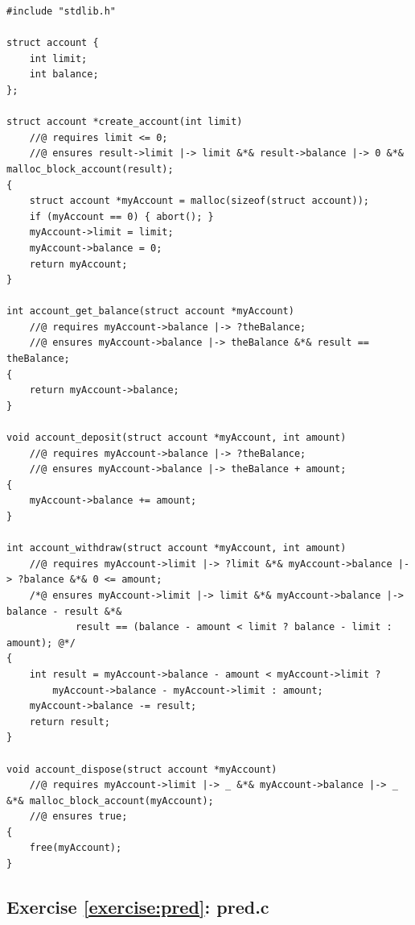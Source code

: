 \documentclass{article}
\begin{document}
\begin{lstlisting}
#include "stdlib.h"

struct account {
    int limit;
    int balance;
};

struct account *create_account(int limit)
    //@ requires limit <= 0;
    //@ ensures result->limit |-> limit &*& result->balance |-> 0 &*& malloc_block_account(result);
{
    struct account *myAccount = malloc(sizeof(struct account));
    if (myAccount == 0) { abort(); }
    myAccount->limit = limit;
    myAccount->balance = 0;
    return myAccount;
}

int account_get_balance(struct account *myAccount)
    //@ requires myAccount->balance |-> ?theBalance;
    //@ ensures myAccount->balance |-> theBalance &*& result == theBalance;
{
    return myAccount->balance;
}

void account_deposit(struct account *myAccount, int amount)
    //@ requires myAccount->balance |-> ?theBalance;
    //@ ensures myAccount->balance |-> theBalance + amount;
{
    myAccount->balance += amount;
}

int account_withdraw(struct account *myAccount, int amount)
    //@ requires myAccount->limit |-> ?limit &*& myAccount->balance |-> ?balance &*& 0 <= amount;
    /*@ ensures myAccount->limit |-> limit &*& myAccount->balance |-> balance - result &*&
            result == (balance - amount < limit ? balance - limit : amount); @*/
{
    int result = myAccount->balance - amount < myAccount->limit ?
        myAccount->balance - myAccount->limit : amount;
    myAccount->balance -= result;
    return result;
}

void account_dispose(struct account *myAccount)
    //@ requires myAccount->limit |-> _ &*& myAccount->balance |-> _ &*& malloc_block_account(myAccount);
    //@ ensures true;
{
    free(myAccount);
}
\end{lstlisting}

\subsection{Exercise \ref{exercise:pred}: pred.c}
\end{document}
